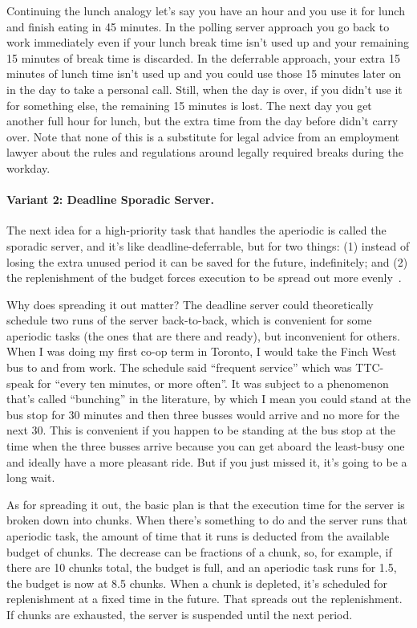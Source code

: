 Continuing the lunch analogy let's say you have an hour and you use it for lunch and finish eating in 45 minutes. In the polling server approach you go back to work immediately even if your lunch break time isn't used up and your remaining 15 minutes of break time is discarded. In the deferrable approach, your extra 15 minutes of lunch time isn't used up and you could use those 15 minutes later on in the day to take a personal call. Still, when the day is over, if you didn't use it for something else, the remaining 15 minutes is lost. The next day you get another full hour for lunch, but the extra time from the day before didn't carry over. Note that none of this is a substitute for legal advice from an employment lawyer about the rules and regulations around legally required breaks during the workday.

\paragraph{Variant 2: Deadline Sporadic Server.}
The next idea for a high-priority task that handles the aperiodic is called the sporadic server, and it's like deadline-deferrable, but for two things: (1) instead of losing the extra unused period it can be saved for the future, indefinitely; and (2) the replenishment of the budget forces execution to be spread out more evenly~\cite{aperiodic-server}. 

Why does spreading it out matter? The deadline server could theoretically schedule two runs of the server back-to-back, which is convenient for some aperiodic tasks (the ones that are there and ready), but inconvenient for others. When I was doing my first co-op term in Toronto, I would take the Finch West bus to and from work. The schedule said ``frequent service'' which was TTC-speak for ``every ten minutes, or more often''. It was subject to a phenomenon that's called ``bunching'' in the literature, by which I mean you could stand at the bus stop for 30 minutes and then three busses would arrive and no more for the next 30. This is convenient if you happen to be standing at the bus stop at the time when the three busses arrive because you can get aboard the least-busy one and ideally have a more pleasant ride. But if you just missed it, it's going to be a long wait.

As for spreading it out, the basic plan is that the execution time for the server is broken down into chunks. When there's something to do and the server runs that aperiodic task, the amount of time that it runs is deducted from the available budget of chunks. The decrease can be fractions of a chunk, so, for example, if there are 10 chunks total, the budget is full, and an aperiodic task runs for 1.5, the budget is now at 8.5 chunks. When a chunk is depleted, it's scheduled for replenishment at a fixed time in the future. That spreads out the replenishment. If chunks are exhausted, the server is suspended until the next period.


